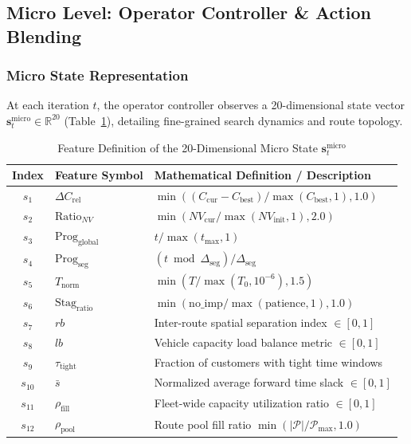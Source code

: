 \documentclass{ieeeaccess}
\begin{document}
\enlargethispage{\baselineskip}
\subsection{Micro Level: Operator Controller \& Action Blending}
\label{sec:micro_controller}

\subsubsection{Micro State Representation}
At each iteration $t$, the operator controller observes a 20-dimensional state vector $\mathbf{s}_t^{\text{micro}} \in \mathbb{R}^{20}$ (Table~\ref{tab:micro_state}), detailing fine-grained search dynamics and route topology.

\begin{table}[!b]
\caption{Feature Definition of the 20-Dimensional Micro State $\mathbf{s}_t^{\text{micro}}$}
\label{tab:micro_state}
\centering
\footnotesize
\begin{tabularx}{\columnwidth}{c l X}
\toprule
\textbf{Index} & \textbf{Feature Symbol} & \textbf{Mathematical Definition / Description} \\
\midrule
$s_1$ & $\Delta C_{\text{rel}}$ & $\min((C_{\text{cur}} - C_{\text{best}})/\max(C_{\text{best}}, 1), 1.0)$ \\
$s_2$ & $\text{Ratio}_{NV}$ & $\min(NV_{\text{cur}}/\max(NV_{\text{init}}, 1), 2.0)$ \\
$s_3$ & $\text{Prog}_{\text{global}}$ & $t / \max(t_{\max}, 1)$ \\
$s_4$ & $\text{Prog}_{\text{seg}}$ & $(t \bmod \Delta_{\text{seg}}) / \Delta_{\text{seg}}$ \\
$s_5$ & $T_{\text{norm}}$ & $\min(T / \max(T_0, 10^{-6}), 1.5)$ \\
$s_6$ & $\text{Stag}_{\text{ratio}}$ & $\min(\text{no\_imp} / \max(\text{patience}, 1), 1.0)$ \\
$s_7$ & $rb$ & Inter-route spatial separation index $\in [0, 1]$ \\
$s_8$ & $lb$ & Vehicle capacity load balance metric $\in [0, 1]$ \\
$s_9$ & $\tau_{\text{tight}}$ & Fraction of customers with tight time windows \\
$s_{10}$ & $\bar{s}$ & Normalized average forward time slack $\in [0, 1]$ \\
$s_{11}$ & $\rho_{\text{fill}}$ & Fleet-wide capacity utilization ratio $\in [0, 1]$ \\
$s_{12}$ & $\rho_{\text{pool}}$ & Route pool fill ratio $\min(|\mathcal{P}|/\mathcal{P}_{\max}, 1.0)$ \\

\end{tabularx}
\end{table}
\end{document}
